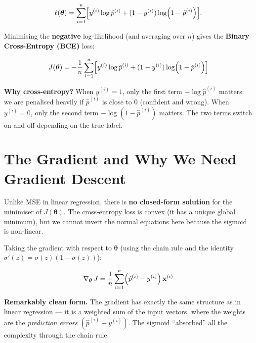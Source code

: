 \documentclass[12pt, a4paper]{article}
\newif\ifstudentmode
\newcommand{\sol}[2][6cm]{%
  \ifstudentmode
    \underline{\hspace{#1}}%
  \else
    {#2}%
  \fi
}
\theoremstyle{definition}
\newcommand{\bth}{\boldsymbol{\theta}}
\newcommand{\bx}{\mathbf{x}}
\newcommand{\sigmoid}{\sigma}
\begin{document}
\[
  \ell(\bth)
  = \sol[10cm]{\sum_{i=1}^{n}
    \Bigl[y^{(i)} \log \hat{p}^{(i)}
      + (1 - y^{(i)}) \log\!\left(1 - \hat{p}^{(i)}\right)\Bigr].}
\]

Minimising the \textbf{negative} log-likelihood (and averaging over $n$) gives
the \textbf{Binary Cross-Entropy (BCE)} loss:

\begin{resultbox}
  \[
    J(\bth)
    = \sol[10cm]{-\frac{1}{n}\sum_{i=1}^{n}
      \Bigl[y^{(i)} \log \hat{p}^{(i)}
        + (1 - y^{(i)}) \log\!\left(1 - \hat{p}^{(i)}\right)\Bigr]}
  \]
\end{resultbox}

\begin{notebox}
  \textbf{Why cross-entropy?}
  When $y^{(i)} = 1$, only the first term $-\log\hat{p}^{(i)}$ matters:
  we are penalised heavily if $\hat{p}^{(i)}$ is close to 0 (confident and
  wrong).  When $y^{(i)} = 0$, only the second term $-\log(1-\hat{p}^{(i)})$
  matters.  The two terms switch on and off depending on the true label.
\end{notebox}

\section{The Gradient and Why We Need Gradient Descent}

Unlike MSE in linear regression, there is \textbf{no closed-form solution}
for the minimiser of $J(\bth)$.  The cross-entropy loss is convex (it has a
unique global minimum), but we cannot invert the normal equations here because
the sigmoid is non-linear.

Taking the gradient with respect to $\bth$ (using the chain rule and the
identity $\sigmoid'(z) = \sigmoid(z)(1-\sigmoid(z))$):

\begin{resultbox}
  \[
    \nabla_{\bth}\,J
    = \sol[8cm]{\frac{1}{n}\sum_{i=1}^{n}
      \Bigl(\hat{p}^{(i)} - y^{(i)}\Bigr)\,\bx^{(i)}}
  \]
\end{resultbox}

\begin{notebox}
  \textbf{Remarkably clean form.}
  The gradient has exactly the same structure as in linear regression —
  it is a weighted sum of the input vectors, where the weights are the
  \emph{prediction errors} $(\hat{p}^{(i)} - y^{(i)})$.
  The sigmoid ``absorbed'' all the complexity through the chain rule.
\end{notebox}
\end{document}
